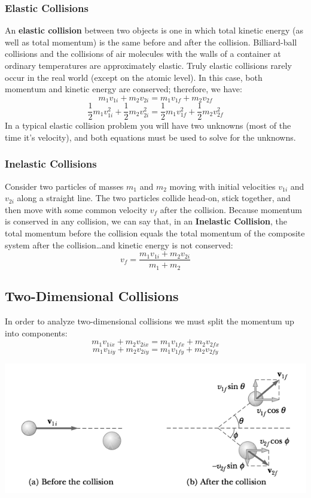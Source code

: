 \documentclass{article}
\begin{document}
\subsubsection{Elastic Collisions}
An \textbf{elastic collision} between two objects is one in which total kinetic energy (as well as total momentum) is the same before and after the collision. Billiard-ball collisions and the collisions of air molecules with the walls of a container at ordinary temperatures are approximately elastic. Truly elastic collisions rarely occur in the real world (except on the atomic level). In this case, both momentum and kinetic energy are conserved; therefore, we have:
\[
m_1v_{1i}+m_2v_{2i}=m_1v_{1f}+m_2v_{2f}
\]
\[
\frac{1}{2}m_1v_{1i}^2+\frac{1}{2}m_2v_{2i}^2=\frac{1}{2}m_1v_{1f}^2+\frac{1}{2}m_2v_{2f}^2
\]
In a typical elastic collision problem you will have two unknowns (most of the time it's velocity), and both equations must be used to solve for the unknowns.
\subsubsection{Inelastic Collisions}
Consider two particles of masses $m_1$ and $m_2$ moving with initial velocities $v_{1i}$ and $v_{2i}$ along a straight line. The two particles collide head-on, stick together, and then move with some common velocity $v_f$ after the collision. Because momentum is conserved in any collision, we can say that, in an \textbf{Inelastic Collision}, the total momentum before the collision equals the total momentum of the composite system after the collision\ldots and kinetic energy is not conserved:
\[
v_f=\frac{m_1v_{1i}+m_2v_{2i}}{m_1+m_2}
\]
\subsection{Two-Dimensional Collisions}
In order to analyze two-dimensional collisions we must split the momentum up into components:
\[
m_1v_{1ix}+m_2v_{2ix}=m_1v_{1fx}+m_2v_{2fx}
\]
\[
m_1v_{1iy}+m_2v_{2iy}=m_1v_{1fy}+m_2v_{2fy}
\]
\centerline{\includegraphics[width=15cm]{collisionP.png}}
\end{document}
